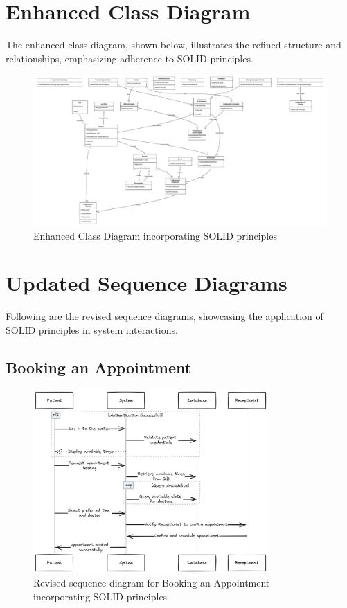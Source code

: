 \documentclass[12pt]{article}
\begin{document}
\section*{Enhanced Class Diagram}
The enhanced class diagram, shown below, illustrates the refined structure and relationships, emphasizing adherence to SOLID principles.

\begin{figure}[h!]
\centering
\includegraphics[width=1\textwidth]{new_class.pdf} %
\caption{Enhanced Class Diagram incorporating SOLID principles}
\end{figure}

\section*{Updated Sequence Diagrams}
Following are the revised sequence diagrams, showcasing the application of SOLID principles in system interactions.

\subsection*{Booking an Appointment}
\begin{figure}[h!]
\centering
\includegraphics[width=0.8\textwidth]{1.png}
\caption{Revised sequence diagram for Booking an Appointment incorporating SOLID principles}
\end{figure}
\end{document}
